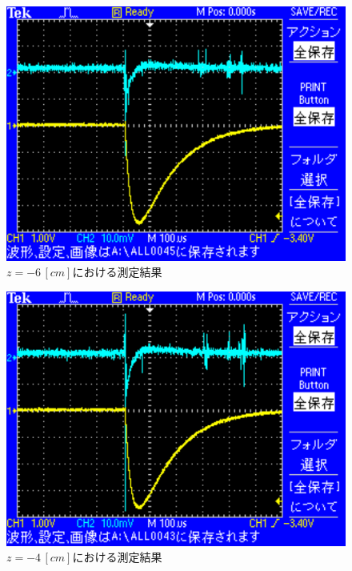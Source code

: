 \begin{figure}[H]
    \centering
    \includegraphics[scale=0.5]{images-21.pdf}
    \caption{$z=-6\,[cm]$における測定結果}
\end{figure}

\begin{figure}[H]
    \centering
    \includegraphics[scale=0.5]{images-20.pdf}
    \caption{$z=-4\,[cm]$における測定結果}
\end{figure}

